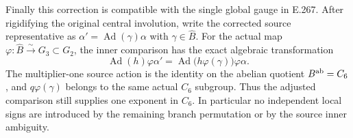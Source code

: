 Finally this correction is compatible with the single global gauge
in E.267.  After rigidifying the original central involution, write
the corrected source representative as
$\alpha'=\operatorname{Ad}(\gamma)\alpha$ with
$\gamma\in\widehat B$.  For the actual map
$\varphi:\widehat B\xrightarrow{\sim}G_3\subset G_2$,
the inner comparison has the exact algebraic transformation
\[
 \operatorname{Ad}(h)\varphi\alpha'
   =\operatorname{Ad}\bigl(h\varphi(\gamma)\bigr)
       \varphi\alpha.                                      \tag{CR.13}
\]
The multiplier-one source action is the identity on the
abelian quotient $B^{\rm ab}=C_6$, and
$q\varphi(\gamma)$ belongs to the same actual $C_6$ subgroup.
Thus the adjusted comparison still supplies one exponent in
$C_6$.  In particular no independent local signs are introduced
by the remaining branch permutation or by the source inner
ambiguity.
